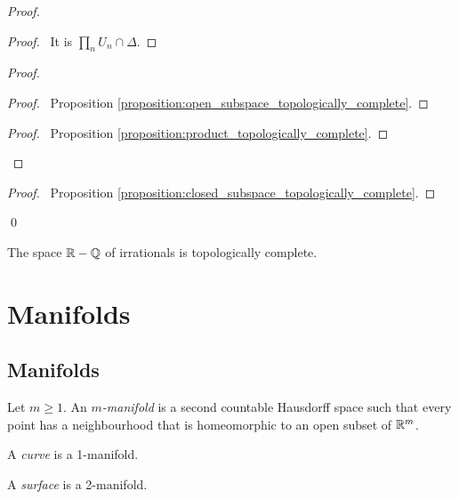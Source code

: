 \begin{proof}
    \pf
    \begin{proof}
        \pf\ It is $\prod_n U_n \cap \Delta$.
    \end{proof}
    \begin{proof}
        \begin{proof}
            \pf\ Proposition \ref{proposition:open_subspace_topologically_complete}.
        \end{proof}
        \qedstep
        \begin{proof}
            \pf\ Proposition \ref{proposition:product_topologically_complete}.
        \end{proof}
    \end{proof}
    \begin{proof}
        \pf\ Proposition \ref{proposition:closed_subspace_topologically_complete}.
    \end{proof}
\qed
\end{proof}

\begin{corollary}
    The space $\mathbb{R} - \mathbb{Q}$ of irrationals is topologically complete.
\end{corollary}

\chapter{Manifolds}

\section{Manifolds}

\begin{definition}[Manifold]
    Let $m \geq 1$. An \emph{$m$-manifold} is a second countable Hausdorff space such that every point has a neighbourhood that is
    homeomorphic to an open subset of $\mathbb{R}^m$.

    A \emph{curve} is a 1-manifold.

    A \emph{surface} is a 2-manifold.
\end{definition}

